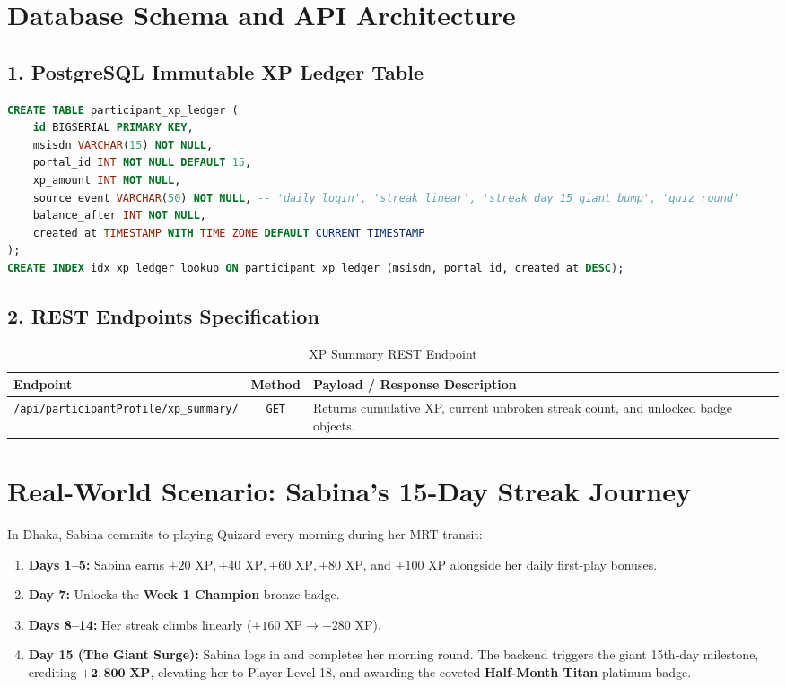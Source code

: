 \section{Database Schema and API Architecture}

\subsection{1. PostgreSQL Immutable XP Ledger Table}
\begin{lstlisting}[language=SQL, caption={PostgreSQL Schema for XP Ledger}]
CREATE TABLE participant_xp_ledger (
    id BIGSERIAL PRIMARY KEY,
    msisdn VARCHAR(15) NOT NULL,
    portal_id INT NOT NULL DEFAULT 15,
    xp_amount INT NOT NULL,
    source_event VARCHAR(50) NOT NULL, -- 'daily_login', 'streak_linear', 'streak_day_15_giant_bump', 'quiz_round'
    balance_after INT NOT NULL,
    created_at TIMESTAMP WITH TIME ZONE DEFAULT CURRENT_TIMESTAMP
);
CREATE INDEX idx_xp_ledger_lookup ON participant_xp_ledger (msisdn, portal_id, created_at DESC);
\end{lstlisting}

\subsection{2. REST Endpoints Specification}
\begin{table}[htbp]
\centering
\small
\begin{tabular}{|p{6.2cm}|c|p{7.5cm}|}
\hline
\rowcolor{primaryBlue!15}
\textbf{Endpoint} & \textbf{Method} & \textbf{Payload / Response Description} \\ \hline
\texttt{/api/participantProfile/}\newline\texttt{xp\_summary/} & \texttt{GET} & Returns cumulative XP, current unbroken streak count, and unlocked badge objects. \\ \hline
\end{tabular}
\caption{XP Summary REST Endpoint}
\end{table}

\section{Real-World Scenario: Sabina's 15-Day Streak Journey}
In Dhaka, Sabina commits to playing Quizard every morning during her MRT transit:

\begin{enumerate}
    \item \textbf{Days 1--5:} Sabina earns $+20\text{ XP}, +40\text{ XP}, +60\text{ XP}, +80\text{ XP}$, and $+100\text{ XP}$ alongside her daily first-play bonuses.
    \item \textbf{Day 7:} Unlocks the \textbf{Week 1 Champion} bronze badge.
    \item \textbf{Days 8--14:} Her streak climbs linearly ($+160\text{ XP} \to +280\text{ XP}$).
    \item \textbf{Day 15 (The Giant Surge):} Sabina logs in and completes her morning round. The backend triggers the giant 15th-day milestone, crediting $\mathbf{+2,800\text{ XP}}$, elevating her to Player Level 18, and awarding the coveted \textbf{Half-Month Titan} platinum badge.
\end{enumerate}

